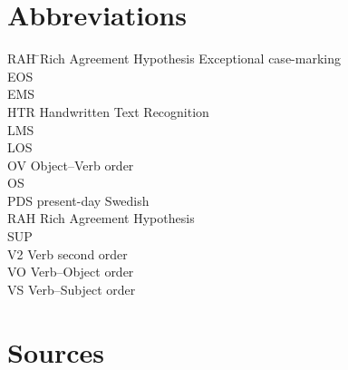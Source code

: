 \documentclass[output=paper]{langscibook}
\begin{document}
\section*{Abbreviations}

\begin{multicols}{2}
\begin{tabbing}
RAH\hspace{1ex} \= Rich Agreement Hypothesis\kill
{} \>  Exceptional case-marking    \\
EOS \>  \\
EMS \>  \\
HTR \>  Handwritten Text Recognition\\
LMS \> \\
LOS \>  \\
OV  \> Object–Verb order \\
OS  \> \\
PDS \>  present-day Swedish\\
RAH \>  Rich Agreement Hypothesis\\
SUP \>  \\
V2  \> Verb second order\\
VO  \> Verb–Object order\\
VS  \> Verb–Subject order
\end{tabbing}
\end{multicols}

\section*{Sources}
\end{document}
